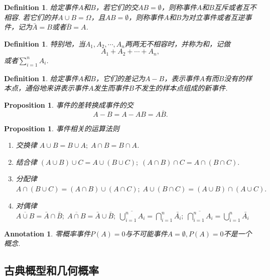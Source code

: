 \documentclass{article}
\newtheorem{proposition}[theorem]{Proposition}
\newtheorem{definition}[theorem]{Definition}
\newtheorem{annotation}[theorem]{Annotation}
\begin{document}
\begin{definition}
\rm 给定事件$A$和$B$，若它们的交$AB = \emptyset$，则称事件$A$和$B${\color{red}互斥}或者{\color{red}互不相容}. 若它们的并$A\cup B = \Omega$，且$AB=\emptyset$，则称事件$A$和$B$为{\color{red}对立事件}或者{\color{red}互逆事件}，记为$\bar{A} = B$或者$\bar{B} = A$.
\end{definition}

\begin{definition}
\rm 特别地，当$A_1,A_2,\cdots,A_n$两两无不相容时，并称为和，记做
$$
A_1 + A_2 + \cdots + A_n,
$$
或者$\sum\limits_{i=1}^n A_i$. 
\end{definition}

\begin{definition}
\rm 给定事件$A$和$B$，它们的差记为$A-B$，表示事件$A$有而$B$没有的样本点，通俗地来讲表示{\color{red}事件$A$发生而事件$B$不发生}的样本点组成的新事件.
\end{definition}

\begin{proposition}
\rm 事件的差转换成事件的交
$$
A-B = A-AB = A\overline{B}. 
$$
\end{proposition}

\begin{proposition}
\rm {\color{red}事件相关的运算法则}
\begin{enumerate}
	\item 交换律 $A \cup B = B \cup A;\;A \cap B = B \cap A$.
	\item 结合律 $(A \cup B) \cup C = A \cup (B \cup C);\; (A \cap B) \cap C = A \cap (B \cap C).$
	\item 分配律 $A \cap (B \cup C) = (A \cap B) \cup (A \cap C);\; A \cup (B \cap C) = (A \cup B) \cap (A \cup C).$
	\item 对偶律 $\overline{A \cup B} = \bar{A} \cap \bar{B};\; \overline{A \cap B} = \bar{A} \cup \bar{B};\; \overline{\bigcup\limits_{i=1}^n A_i} = \bigcap\limits_{i=1}^n \bar{A_i};\; \overline{\bigcap\limits_{i=1}^n A_i} = \bigcup\limits_{i=1}^n \bar{A_i}$ 
\end{enumerate}
\end{proposition}

\begin{annotation}
\rm {\color{red} 零概率事件$P(A) = 0$与不可能事件$A=\emptyset,P(A) = 0$不是一个概念}.
\end{annotation}

\subsection{古典概型和几何概率}
\end{document}
